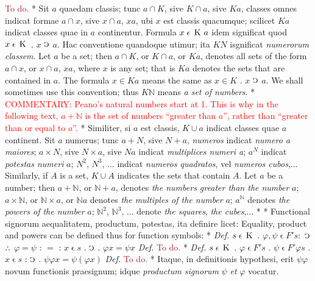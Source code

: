 \documentclass{book}
\newcommand{\C}{\mathop{\sbox0{$\displaystyle$$\reflectbox{C}$} %
\raisebox{-\height+\ht0-0.05cm}[\ht0][\dp0]{\scalebox{0.8}[0.8]{\copy0}}}\displaylimits} %
\newcommand{\pppNoSpace}{\leavevmode\lower0ex\hbox{.}\kern-0.1em\raise0.7ex\hbox{.}\kern-0.1em\lower0ex\hbox{.}} %
\newcommand{\smallIn}{\ensuremath{\mathrel{\epsilon}}}
\newcommand{\K}{\mathop{\thinspace \text{K} \thinspace}}
\newcommand\commentary[1]{\textcolor{red}{COMMENTARY: #1}}
\newcommand\todo{\textcolor{brown}{To do.}}
\newenvironment{translateTwoCol}
               { %
                 \columnratio{0.5, 0.5} \begin{paracol}{2}
                 \newcommand{\LAT}{\switchcolumn[0]*}
                 \newcommand{\ENG}{\switchcolumn[1]}
               }
               { %
                 \let\ENG\undefined
                 \let\LAT\undefined
                 \end{paracol}
               }
\begin{document}
\begin{translateTwoCol}
\ENG
\todo
\LAT
Sit $a$ quaedam classis; tunc $a \cap K$, sive $K \cap a$, sive $K a$, classes omnes indicat formae $a \cap x$, sive $x \cap a$, $x a$, ubi $x$ est classis quacumque; scilicet $K a$ indicat classes quae in $a$ continentur. Formula $x \smallIn \K a$ idem significat quod $x \smallIn \K$ . $x$ $\C$ $a$. Hac conventione quandoque utimur; ita $K N$ isgnificat \emph{numerorum classem}.
\ENG
Let $a$ be a set; then $a \cap K$, or $K \cap a$, or $K a$, denotes all sets of the form $a \cap x$, or $x \cap a$, $x a$, where $x$ is any set; that is $K a$ denotes the sets that are contained in $a$. The formula $x \in K a$ means the same as  $x \in K$ . $x$ $\C$ $a$. We shall sometimes use this convention; thus $K \mathbb{N}$ means \emph{a set of numbers}.
\LAT
\ENG
\commentary{Peano's natural numbers start at 1. This is why in the following text, $a + \mathbb{N}$ is the set of numbers ``greater than $a$'', rather than ``greater than or equal to $a$''.}
\LAT
Similiter, si $a$ est classis, $K \cup a$ indicat classes quae $a$ continent. Sit $a$ numerus; tunc $a + N$, sive $N + a$, \emph{numeros} indicat \emph{numero a maiores}; $a \times N$, sive $N \times a$, sive $N a$ indicat \emph{multiplices numeri a}; $a^N$ indicat \emph{potestas numeri} $a$; $N^2$, $N^3$, ... indicat \emph{numeros quadratos}, vel \emph{numeros cubos},...
\ENG
Similarly, if $A$ is a set, $K \cup A$ indicates the sets that contain $A$. Let $a$ be a number; then $a + \mathbb{N}$, or $\mathbb{N} + a$, denotes \emph{the numbers greater than the number} $a$; $a \times \mathbb{N}$, or $\mathbb{N} \times a$, or $\mathbb{N} a$ denotes \emph{the multiples of the number} $a$; $a^\mathbb{N}$ denotes \emph{the powers of the number} $a$; $\mathbb{N}^2$, $\mathbb{N}^3$, ... denote \emph{the squares}, \emph{the cubes},...
\LAT
\hfill
\ENG
\hfill
\LAT
Functional signorum aequalitatem, productum, potestas, ita definire licet:
\ENG
Equality, product and powers can be defined thus for function symbols:
\LAT
\emph{Def.} \hspace{0.25cm} $s \smallIn \K$ . $\varphi, \psi \smallIn F' s :$ $\C$ $\pppNoSpace$ $\varphi = \psi$ : $=$ : $x \smallIn s$ . $\C$ . $\varphi x = \psi x$
\ENG
\emph{Def.} \hspace{0.25cm} \todo
\LAT
\emph{Def.} \hspace{0.25cm} $s \smallIn \K$ . $\varphi \smallIn F' s$ $.$ $\psi \smallIn F' \varphi s$ . $x \smallIn s$ : $\C$ . $\psi \varphi x = \psi (\varphi x)$
\ENG
\emph{Def.} \hspace{0.25cm} \todo
\LAT
Itaque, in definitionis hypothesi, erit $\psi \varphi$ novum functionis praesignum; idque \emph{productum signorum} $\psi$ \emph{et} $\varphi$ vocatur.

\end{translateTwoCol}
\end{document}
